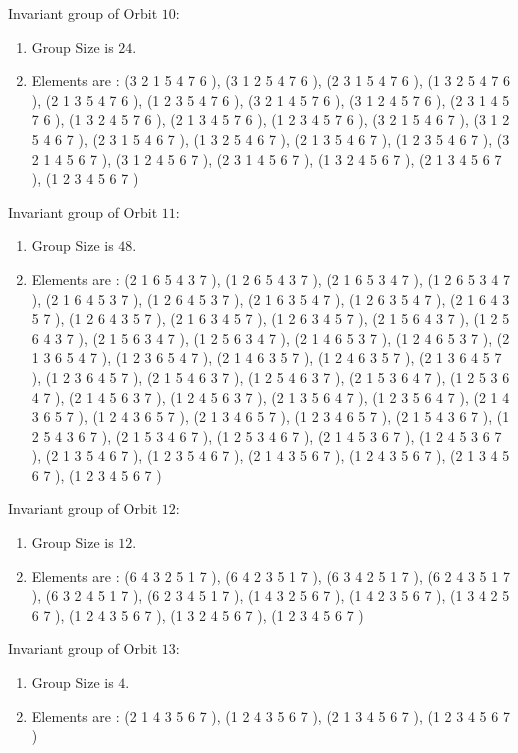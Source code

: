 \documentclass[12pt]{article}
\begin{document}
Invariant group of Orbit $10$:
\begin{enumerate}
\item Group Size is $24$.
\item Elements are : (3 2 1 5 4 7 6  ), (3 1 2 5 4 7 6  ), (2 3 1 5 4 7 6  ), (1 3 2 5 4 7 6  ), (2 1 3 5 4 7 6  ), (1 2 3 5 4 7 6  ), (3 2 1 4 5 7 6  ), (3 1 2 4 5 7 6  ), (2 3 1 4 5 7 6  ), (1 3 2 4 5 7 6  ), (2 1 3 4 5 7 6  ), (1 2 3 4 5 7 6  ), (3 2 1 5 4 6 7  ), (3 1 2 5 4 6 7  ), (2 3 1 5 4 6 7  ), (1 3 2 5 4 6 7  ), (2 1 3 5 4 6 7  ), (1 2 3 5 4 6 7  ), (3 2 1 4 5 6 7  ), (3 1 2 4 5 6 7  ), (2 3 1 4 5 6 7  ), (1 3 2 4 5 6 7  ), (2 1 3 4 5 6 7  ), (1 2 3 4 5 6 7  )
\end{enumerate}
Invariant group of Orbit $11$:
\begin{enumerate}
\item Group Size is $48$.
\item Elements are : (2 1 6 5 4 3 7  ), (1 2 6 5 4 3 7  ), (2 1 6 5 3 4 7  ), (1 2 6 5 3 4 7  ), (2 1 6 4 5 3 7  ), (1 2 6 4 5 3 7  ), (2 1 6 3 5 4 7  ), (1 2 6 3 5 4 7  ), (2 1 6 4 3 5 7  ), (1 2 6 4 3 5 7  ), (2 1 6 3 4 5 7  ), (1 2 6 3 4 5 7  ), (2 1 5 6 4 3 7  ), (1 2 5 6 4 3 7  ), (2 1 5 6 3 4 7  ), (1 2 5 6 3 4 7  ), (2 1 4 6 5 3 7  ), (1 2 4 6 5 3 7  ), (2 1 3 6 5 4 7  ), (1 2 3 6 5 4 7  ), (2 1 4 6 3 5 7  ), (1 2 4 6 3 5 7  ), (2 1 3 6 4 5 7  ), (1 2 3 6 4 5 7  ), (2 1 5 4 6 3 7  ), (1 2 5 4 6 3 7  ), (2 1 5 3 6 4 7  ), (1 2 5 3 6 4 7  ), (2 1 4 5 6 3 7  ), (1 2 4 5 6 3 7  ), (2 1 3 5 6 4 7  ), (1 2 3 5 6 4 7  ), (2 1 4 3 6 5 7  ), (1 2 4 3 6 5 7  ), (2 1 3 4 6 5 7  ), (1 2 3 4 6 5 7  ), (2 1 5 4 3 6 7  ), (1 2 5 4 3 6 7  ), (2 1 5 3 4 6 7  ), (1 2 5 3 4 6 7  ), (2 1 4 5 3 6 7  ), (1 2 4 5 3 6 7  ), (2 1 3 5 4 6 7  ), (1 2 3 5 4 6 7  ), (2 1 4 3 5 6 7  ), (1 2 4 3 5 6 7  ), (2 1 3 4 5 6 7  ), (1 2 3 4 5 6 7  )
\end{enumerate}
Invariant group of Orbit $12$:
\begin{enumerate}
\item Group Size is $12$.
\item Elements are : (6 4 3 2 5 1 7  ), (6 4 2 3 5 1 7  ), (6 3 4 2 5 1 7  ), (6 2 4 3 5 1 7  ), (6 3 2 4 5 1 7  ), (6 2 3 4 5 1 7  ), (1 4 3 2 5 6 7  ), (1 4 2 3 5 6 7  ), (1 3 4 2 5 6 7  ), (1 2 4 3 5 6 7  ), (1 3 2 4 5 6 7  ), (1 2 3 4 5 6 7  )
\end{enumerate}
Invariant group of Orbit $13$:
\begin{enumerate}
\item Group Size is $4$.
\item Elements are : (2 1 4 3 5 6 7  ), (1 2 4 3 5 6 7  ), (2 1 3 4 5 6 7  ), (1 2 3 4 5 6 7  )
\end{enumerate}
\end{document}
